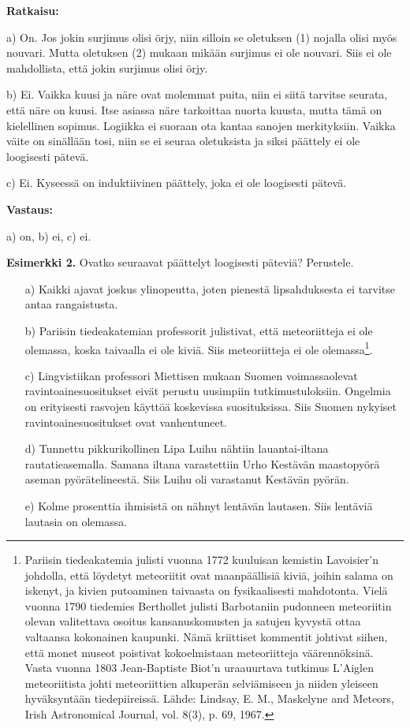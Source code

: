 {\bf Ratkaisu:}

a)  On. Jos jokin surjimus olisi örjy, niin silloin se oletuksen (1) nojalla olisi myös nouvari. Mutta oletuksen (2) mukaan mikään surjimus ei ole nouvari. Siis ei ole
mahdollista, että jokin surjimus olisi örjy. 

b) Ei. Vaikka kuusi ja näre ovat molemmat puita, niin ei siitä tarvitse seurata,   
että näre on kuusi. Itse asiassa näre tarkoittaa nuorta kuusta, mutta tämä on kielellinen sopimus. Logiikka ei suoraan ota kantaa sanojen merkityksiin. Vaikka väite on sinällään tosi, niin se ei seuraa oletuksista ja siksi päättely ei ole loogisesti pätevä.

c) Ei. Kyseessä on induktiivinen päättely, joka ei ole loogisesti pätevä. 

{\bf Vastaus:}

a) on, b) ei, c) ei.


{\bf Esimerkki 2.} Ovatko seuraavat päättelyt loogisesti päteviä? Perustele.
\begin{itemize}
\item[a)] Kaikki ajavat joskus ylinopeutta, joten pienestä lipsahduksesta ei tarvitse antaa rangaistusta.
\item[b)] Pariisin tiedeakatemian professorit julistivat, että meteoriitteja ei ole olemassa, koska taivaalla ei ole kiviä. Siis meteoriitteja ei ole olemassa\footnote{Pariisin tiedeakatemia julisti vuonna 1772 kuuluisan kemistin Lavoisier'n johdolla, että löydetyt meteoriitit ovat maanpäällisiä kiviä, joihin salama on iskenyt, ja kivien putoaminen taivaasta on fysikaalisesti mahdotonta. Vielä vuonna 1790 tiedemies Berthollet julisti Barbotaniin pudonneen meteoriitin olevan valitettava osoitus kansanuskomusten ja satujen kyvystä ottaa valtaansa kokonainen kaupunki. Nämä kriittiset kommentit johtivat siihen, että monet museot poistivat kokoelmistaan meteoriitteja väärennöksinä. Vasta vuonna 1803 Jean-Baptiste Biot'n uraauurtava tutkimus L'Aiglen meteoriitista johti meteoriittien alkuperän selviämiseen ja niiden yleiseen hyväksyntään tiedepiireissä. Lähde: Lindsay, E. M., Maskelyne and Meteors, Irish Astronomical Journal, vol. 8(3), p. 69, 1967.}.
\item[c)] Lingvistiikan professori Miettisen mukaan Suomen voimassaolevat ravintoainesuositukset eivät perustu uusimpiin tutkimustuloksiin. Ongelmia on erityisesti rasvojen käyttöä koskevissa suosituksissa. Siis Suomen nykyiset ravintoainesuositukset ovat vanhentuneet.
\item[d)] Tunnettu pikkurikollinen Lipa Luihu nähtiin lauantai-iltana rautatieasemalla. Samana iltana varastettiin Urho Kestävän maastopyörä aseman pyörätelineestä. Siis Luihu oli varastanut Kestävän pyörän.
\item[e)] Kolme prosenttia ihmisistä on nähnyt lentävän lautasen. Siis lentäviä lautasia on olemassa.
\end{itemize}


